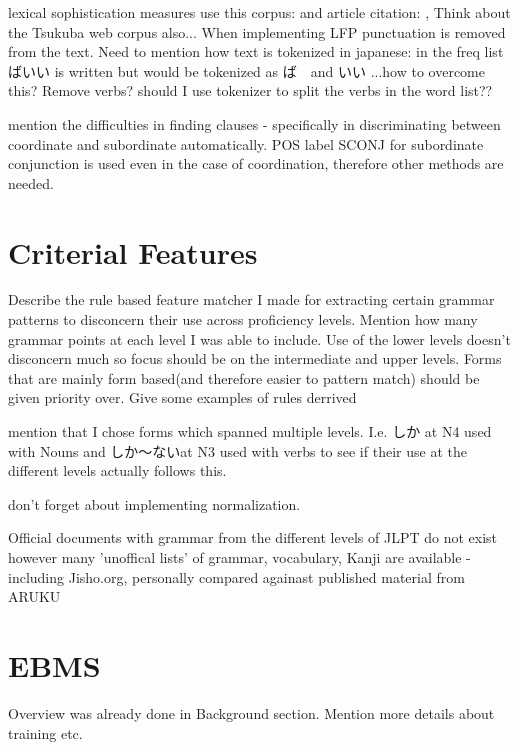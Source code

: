 lexical sophistication measures use this corpus: \cite{BCCWJ_List} and article citation: \cite{maekawa2014}, Think
about the Tsukuba web corpus also...
When implementing LFP punctuation is removed from the text. Need to mention how text is tokenized in japanese: in
the freq list ばいい is written but would be tokenized as ば　and いい ...how to overcome this? Remove verbs? should I use
tokenizer to split the verbs in the word list??

mention the difficulties in finding clauses - specifically in discriminating between coordinate and subordinate
automatically.  POS label SCONJ for subordinate conjunction is used even in the case of coordination, therefore
other methods are needed.

\section{Criterial Features}
Describe the rule based feature matcher I made for extracting certain grammar patterns to disconcern their use
across proficiency levels. Mention how many grammar points at each level I was able to include. Use of the lower
levels doesn't disconcern much so focus should be on the intermediate and upper levels.  Forms that are mainly form
based(and therefore easier to pattern match) should be given priority over. Give some examples of rules derrived

mention that I chose forms which spanned multiple levels. I.e. しか at N4 used with Nouns and しか〜ないat N3 used
with verbs to see if their use at the different levels actually follows this.

don't forget about implementing normalization.

Official documents with grammar from the different levels of JLPT do not exist however many 'unoffical lists' of
grammar, vocabulary, Kanji are available - including Jisho.org, personally compared againast published material from
ARUKU

\section{EBMS}
 Overview was already done in Background section. Mention more details about training etc.


